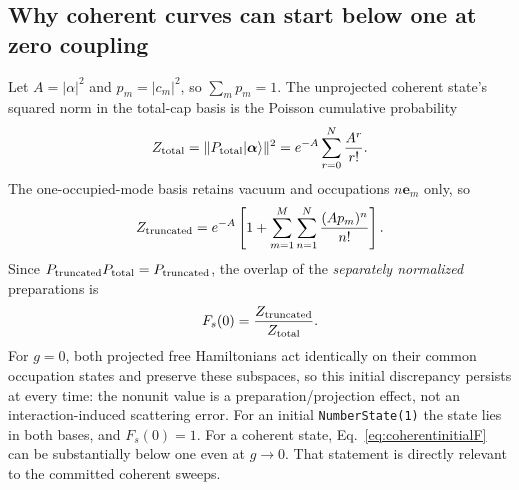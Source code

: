 \documentclass[11pt,a4paper]{article}
\newcommand{\ket}[1]{\lvert #1\rangle}
\newcommand{\code}[1]{\nolinkurl{#1}}
\begin{document}
\subsection{Why coherent curves can start below one at zero coupling}
Let $A=|\alpha|^2$ and $p_m=|c_m|^2$, so $\sum_mp_m=1$. The unprojected coherent state's squared norm in the total-cap basis is the Poisson cumulative probability
\begin{equation}
 Z_{\rm total}=\|P_{\rm total}\ket{\boldsymbol\alpha}\|^2
 =e^{-A}\sum_{r=0}^{N}\frac{A^r}{r!}.
 \label{eq:ztotal}
\end{equation}
The one-occupied-mode basis retains vacuum and occupations $n\mathbf e_m$ only, so
\begin{equation}
 Z_{\rm truncated}=e^{-A}\left[1+
 \sum_{m=1}^M\sum_{n=1}^N\frac{(Ap_m)^n}{n!}\right].
 \label{eq:ztrunc}
\end{equation}
Since $P_{\rm truncated}P_{\rm total}=P_{\rm truncated}$, the overlap of the \emph{separately normalized} preparations is
\begin{equation}
 F_s(0)=\frac{Z_{\rm truncated}}{Z_{\rm total}}.
 \label{eq:coherentinitialF}
\end{equation}
For $g=0$, both projected free Hamiltonians act identically on their common occupation states and preserve these subspaces, so this initial discrepancy persists at every time: the nonunit value is a preparation/projection effect, not an interaction-induced scattering error. For an initial \code{NumberState(1)} the state lies in both bases, and $F_s(0)=1$. For a coherent state, Eq.~\eqref{eq:coherentinitialF} can be substantially below one even at $g\to0$. That statement is directly relevant to the committed coherent sweeps.
\end{document}
